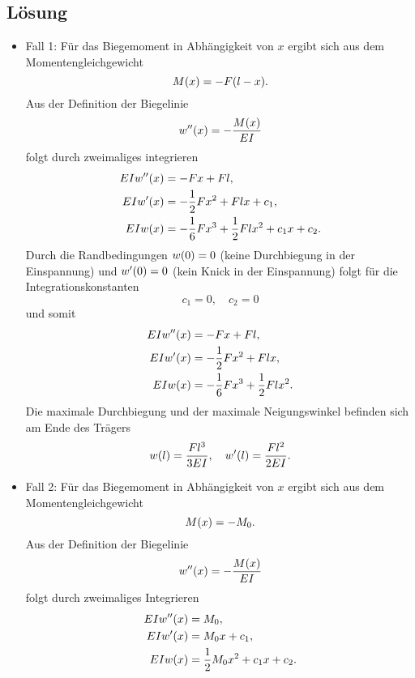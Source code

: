 \documentclass{exercise}
\begin{document}
    \subsection*{Lösung}
    \begin{itemize}
        \item Fall 1: Für das Biegemoment in Abhängigkeit von \(x\) ergibt sich aus dem Momentengleichgewicht
        \[
            M\parentheses*{x} = -F\parentheses*{l - x}.
        \]
        Aus der Definition der Biegelinie
        \[
            w''\parentheses*{x} = -\frac{M\parentheses*{x}}{EI}
        \]
        folgt durch zweimaliges integrieren
        \begin{align*}
            EIw''\parentheses*{x} &= -Fx + Fl,\\
            EIw'\parentheses*{x} &= -\frac{1}{2}Fx^2 + Flx + c_1,\\
            EIw\parentheses*{x} &= -\frac{1}{6}Fx^3 + \frac{1}{2}Flx^2 + c_1 x + c_2.
        \end{align*}
        Durch die Randbedingungen \(w\parentheses*{0} = 0\) (keine Durchbiegung in der Einspannung) und \(w'\parentheses*{0} = 0\) (kein Knick in der Einspannung) folgt für die Integrationskonstanten
        \[
            c_1 = 0, \quad c_2 = 0
        \]
        und somit
        \begin{align*}
            EIw''\parentheses*{x} &= -Fx + Fl,\\
            EIw'\parentheses*{x} &= -\frac{1}{2}Fx^2 + Flx,\\
            EIw\parentheses*{x} &= -\frac{1}{6}Fx^3 + \frac{1}{2}Flx^2.
        \end{align*}
        Die maximale Durchbiegung und der maximale Neigungswinkel befinden sich am Ende des Trägers
        \[
            w\parentheses*{l} = \frac{Fl^3}{3EI}, \quad w'\parentheses*{l} = \frac{Fl^2}{2EI}.
        \]
        \item Fall 2: Für das Biegemoment in Abhängigkeit von \(x\) ergibt sich aus dem Momentengleichgewicht
        \[
            M\parentheses*{x} = -M_0.
        \]
        Aus der Definition der Biegelinie
        \[
            w''\parentheses*{x} = -\frac{M\parentheses*{x}}{EI}
        \]
        folgt durch zweimaliges Integrieren
        \begin{align*}
            EIw''\parentheses*{x} &= M_0,\\
            EIw'\parentheses*{x} &= M_0 x + c_1,\\
            EIw\parentheses*{x} &= \frac{1}{2}M_0 x^2 + c_1 x + c_2.

\end{align*}
\end{itemize}
\end{document}
